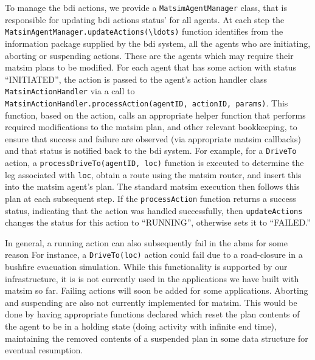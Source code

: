 To manage the \gls{bdi} actions, we provide a \lstinline{MatsimAgentManager} class, that
is responsible for updating \gls{bdi} actions status' for all agents.
At each step the \lstinline{MatsimAgentManager.updateActions(\ldots)} function
  identifies from the information package supplied by the \gls{bdi} system,
  all the agents who are initiating, aborting or suspending
  actions. These are the agents which may require their \gls{matsim} plans
  to be modified.  For each agent that has some action with  
  status ``INITIATED'', the action is passed to the agent's action handler 
  class \lstinline{MatsimActionHandler} via a call to
  \lstinline{MatsimActionHandler.processAction(agentID, actionID, params)}.
  This function, based on the action, calls an appropriate helper
  function that performs required modifications to the \gls{matsim} plan, and other
  relevant bookkeeping, to ensure that success and failure are observed
  (via appropriate \gls{matsim} callbacks) and that status is notified back
  to the \gls{bdi} system.  
%
For example, for a \lstinline{DriveTo} action, a
\lstinline{processDriveTo(agentID, loc)} function is executed to determine the leg 
associated with \lstinline{loc}, obtain a route using the \gls{matsim} router, and
insert this into the \gls{matsim} agent's plan. The standard \gls{matsim} execution then
follows this plan at each subsequent step. 
If the \lstinline{processAction} function returns a success
  status, indicating that the action was handled successfully, then
  \lstinline{updateActions} changes the status for this
  action to ``RUNNING'', otherwise sets it to ``FAILED.''   
  
  In general, a running
  action can also subsequently fail in the \gls{abms} for some reason For
  instance, a \lstinline{DriveTo(loc)} action could fail due to a
  road-closure in a bushfire evacuation simulation.
  While this
  functionality is supported by our infrastructure, it is is not currently used
  in the applications we have built with \gls{matsim} so far. Failing actions will
  soon be added for some applications.
  Aborting and suspending are also not currently
  implemented for \gls{matsim}.  This would be done by having appropriate
  functions declared which reset the plan contents of the agent to be
  in a holding state (doing activity with infinite end time),
  maintaining the removed contents of a suspended plan in some data
  structure for eventual resumption.
  
